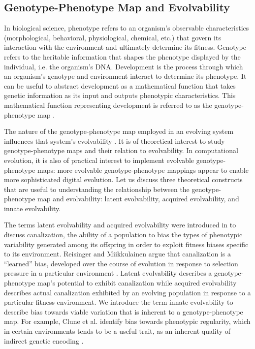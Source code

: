 \subsection{Genotype-Phenotype Map and Evolvability}

In biological science, phenotype refers to an organism's observable characteristics (morphological, behavioral, physiological, chemical, etc.) that govern its interaction with the environment and ultimately determine its fitness.
Genotype refers to the heritable information that shapes the phenotype displayed by the individual, i.e. the organism's DNA.
Development is the process through which an organism's genotype and environment interact to determine its phenotype.
It can be useful to abstract development as a mathematical function that takes genetic information as its input and outputs phenotypic characteristics.
This mathematical function representing development is referred to as the genotype-phenotype map \cite{alberch1991genes}.

The nature of the genotype-phenotype map employed in an evolving system influences that system's evolvability \cite{pigliucci2010genotype}.
It is of theoretical interest to study genotype-phenotype maps and their relation to evolvability.
In computational evolution, it is also of practical interest to implement evolvable genotype-phenotype maps: more evolvable genotype-phenotype mappings appear to enable more sophisticated digital evolution.
Let us discuss three theoretical constructs that are useful to understanding the relationship between the genotype-phenotype map and evolvability: latent evolvability, acquired evolvability, and innate evolvability.

The terms latent evolvability and acquired evolvability were introduced in \cite{reisinger2005towards} to discuss canalization, the ability of a population to bias the types of phenotypic variability generated among its offspring in order to exploit fitness biases specific to its environment.
Reisinger and Miikkulainen argue that canalization is a ``learned'' bias, developed over the course of evolution in response to selection pressure in a particular environment \cite{reisinger2005towards}.
Latent evolvability describes a genotype-phenotype map's potential to exhibit canalization while acquired evolvability describes actual canalization exhibited by an evolving population in response to a particular fitness environment.
We introduce the term innate evolvability to describe bias towards viable variation that is inherent to a genotype-phenotype map.
For example, Clune et al. identify bias towards phenotypic regularity, which in certain environments tends to be a useful trait, as an inherent quality of indirect genetic encoding \cite{clune2008generative}.

